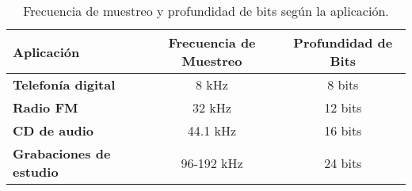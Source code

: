 \begin{table}[H]
    \centering
    \caption{Frecuencia de muestreo y profundidad de bits según la aplicación.}
    \begin{tabular}{|l|c|c|}
        \hline
        \textbf{Aplicación} & \textbf{Frecuencia de Muestreo} & \textbf{Profundidad de Bits} \\
        \hline
        \textbf{Telefonía digital} & 8 kHz & 8 bits \\
        \textbf{Radio FM} & 32 kHz & 12 bits \\
        \textbf{CD de audio} & 44.1 kHz & 16 bits \\
        \textbf{Grabaciones de estudio} & 96-192 kHz & 24 bits \\
        \hline
    \end{tabular}
    \label{tabla:frecuencia_muestreo}
\end{table}